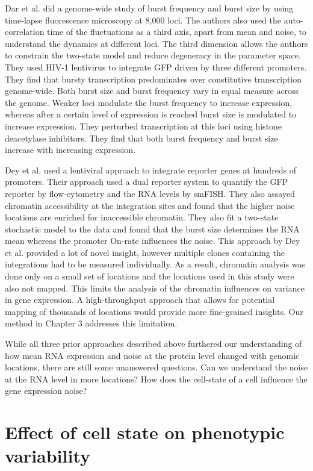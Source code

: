 Dar et al. \cite{dar2012pnas} did a genome-wide study of burst frequency and burst size by using time-lapse fluorescence microscopy at 8,000 loci. The authors also used the auto-correlation time of the fluctuations as a third axis, apart from mean and noise, to understand the dynamics at different loci. The third dimension allows the authors to constrain the two-state model and reduce degeneracy in the parameter space. They used HIV-1 lentivirus to integrate GFP driven by three different promoters. They find that bursty transcription predominates over constitutive transcription genome-wide. Both burst size and burst frequency vary in equal measure across the genome. Weaker loci modulate the burst frequency to increase expression, whereas after a certain level of expression is reached burst size is modulated to increase expression. They perturbed transcription at this loci using histone deacetylase inhibitors. They find that both burst frequency and burst size increase with increasing expression. 

Dey et al. \cite{dey2015msb} used a lentiviral approach to integrate reporter genes at hundreds of promoters. Their approach used a dual reporter system to quantify the GFP reporter by flow-cytometry and the RNA levels by smFISH. They also assayed chromatin accessibility at the integration sites and found that the higher noise locations are enriched for inaccessible chromatin. They also fit a two-state stochastic model to the data and found that the burst size determines the RNA mean whereas the promoter On-rate influences the noise. This approach by Dey et al. provided a lot of novel insight, however multiple clones containing the integrations had to be measured individually. As a result, chromatin analysis was done only on a small set of locations and the locations used in this study were also not mapped. This limits the analysis of the chromatin influences on variance in gene expression. A high-throughput approach that allows for potential mapping of thousands of locations would provide more fine-grained insights. Our method in Chapter 3 addresses this limitation.

While all three prior approaches described above furthered our understanding of how mean RNA expression and noise at the protein level changed with genomic locations, there are still some unanswered questions. Can we understand the noise at the RNA level in more locations? How does the cell-state of a cell influence the gene expression noise?

\section{Effect of cell state on phenotypic variability}

